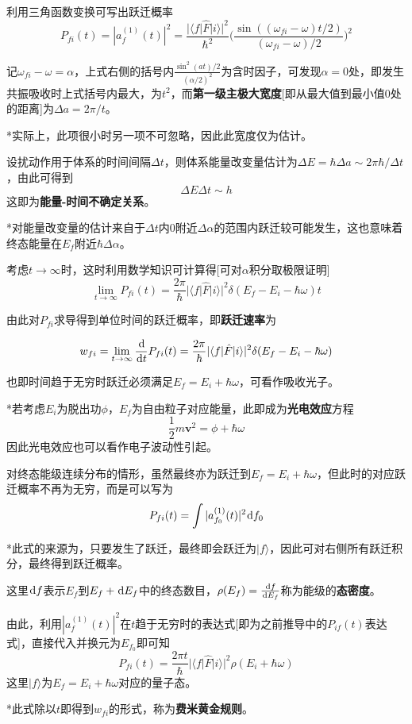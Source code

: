\documentclass[a4paper,UTF8,fontset=windows]{ctexart}
\newcommand*{\dr}{\hspace{0.07em}\mathrm{d}}
\newcommand*{\ket}[1]{|#1\rangle}
\newcommand*{\blk}[3]{\langle#1|#2|#3\rangle}
\begin{document}
利用三角函数变换可写出跃迁概率
$$P_{fi}(t)=|a_f^{(1)}(t)|^2=\frac{|\blk{f}{\hat{F}}{i}|^2}{\hbar^2}\bigg(\frac{\sin((\omega_{fi}-\omega)t/2)}{(\omega_{fi}-\omega)/2}\bigg)^2$$

记$\omega_{fi}-\omega=\alpha$，上式右侧的括号内$\frac{\sin^2(at)/2}{(\alpha/2)^2}$为含时因子，可发现$\alpha=0$处，即发生共振吸收时上式括号内最大，为$t^2$，而\textbf{第一级主极大宽度}[即从最大值到最小值0处的距离]为$\Delta a=2\pi/t$。

*实际上，此项很小时另一项不可忽略，因此此宽度仅为估计。

设扰动作用于体系的时间间隔$\Delta t$，则体系能量改变量估计为$\Delta E=\hbar\Delta a\sim 2\pi\hbar/\Delta t$，由此可得到
$$\Delta E\Delta t\sim h$$
这即为\textbf{能量-时间不确定关系}。

*对能量改变量的估计来自于$\Delta t$内0附近$\Delta\alpha$的范围内跃迁较可能发生，这也意味着终态能量在$E_f$附近$\hbar\Delta\alpha$。

考虑$t\to\infty$时，这时利用数学知识可计算得[可对$\alpha$积分取极限证明]
$$\lim_{t\to\infty}P_{fi}(t)=\frac{2\pi}{\hbar}|\blk{f}{\hat{F}}{i}|^2\delta(E_f-E_i-\hbar\omega)t$$

由此对$P_{fi}$求导得到单位时间的跃迁概率，即\textbf{跃迁速率}为

$$w_{fi}=\lim_{t\to\infty}\frac{\dr}{\dr t}P_{fi}(t)=\frac{2\pi}{\hbar}|\blk{f}{\hat{F}}{i}|^2\delta(E_f-E_i-\hbar\omega)$$

也即时间趋于无穷时跃迁必须满足$E_f=E_i+\hbar\omega$，可看作吸收光子。

*若考虑$E_i$为脱出功$\phi$，$E_f$为自由粒子对应能量，此即成为\textbf{光电效应}方程
$$\frac{1}{2}m\mathbf{v}^2=\phi+\hbar\omega$$
因此光电效应也可以看作电子波动性引起。

对终态能级连续分布的情形，虽然最终亦为跃迁到$E_f=E_i+\hbar\omega$，但此时的对应跃迁概率不再为无穷，而是可以写为
$$P_{fi}(t)=\int|a_{f_0}^{(1)}(t)|^2\dr {f_0}$$

*此式的来源为，只要发生了跃迁，最终即会跃迁为$\ket{f}$，因此可对右侧所有跃迁积分，最终得到跃迁概率。

这里$\dr f$表示$E_f$到$E_f+\dr E_f$中的终态数目，$\rho(E_f)=\frac{\dr f}{\dr E_f}$称为能级的\textbf{态密度}。

由此，利用$|a_f^{(1)}(t)|^2$在$t$趋于无穷时的表达式[即为之前推导中的$P_{if}(t)$表达式]，直接代入并换元为$E_{f_0}$即可知
$$P_{fi}(t)=\frac{2\pi t}{\hbar}|\blk{f}{\hat{F}}{i}|^2\rho(E_i+\hbar\omega)$$
这里$\ket{f}$为$E_f=E_i+\hbar\omega$对应的量子态。

*此式除以$t$即得到$w_{fi}$的形式，称为\textbf{费米黄金规则}。
\end{document}
